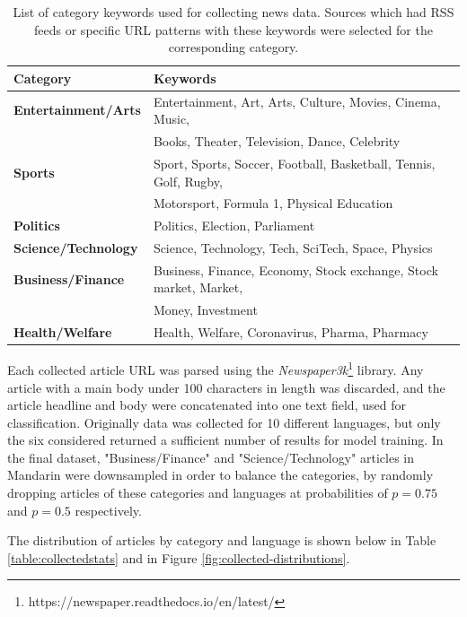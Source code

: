 \documentclass{l4proj}
\begin{document}
\begin{table}[h]
\begin{tabular}{ll}
\hline
\textbf{Category}           & \textbf{Keywords}                                                 \\ \hline
\textbf{Entertainment/Arts} & Entertainment, Art, Arts, Culture, Movies, Cinema, Music,         \\
\textbf{}                   & Books, Theater, Television, Dance, Celebrity                      \\
\textbf{Sports}             & Sport, Sports, Soccer, Football, Basketball, Tennis, Golf, Rugby, \\
\textbf{}                   & Motorsport, Formula 1, Physical Education                         \\
\textbf{Politics}           & Politics, Election, Parliament                                    \\
\textbf{Science/Technology} & Science, Technology, Tech, SciTech, Space, Physics                \\
\textbf{Business/Finance}   & Business, Finance, Economy, Stock exchange, Stock market, Market, \\
\textbf{}                   & Money, Investment                                                 \\
\textbf{Health/Welfare}     & Health, Welfare, Coronavirus, Pharma, Pharmacy                    \\ \hline
\end{tabular}
\caption{List of category keywords used for collecting news data. Sources which had RSS feeds or specific URL patterns with these keywords were selected for the corresponding category.}
\label{fig:dataset_category_keywords}
\end{table}

Each collected article URL was parsed using the \emph{Newspaper3k}\footnote{https://newspaper.readthedocs.io/en/latest/} library. Any article with a main body under 100 characters in length was discarded, and the article headline and body were concatenated into one text field, used for classification. Originally data was collected for 10 different languages, but only the six considered returned a sufficient number of results for model training. In the final dataset, "Business/Finance" and "Science/Technology" articles in Mandarin were downsampled in order to balance the categories, by randomly dropping articles of these categories and languages at probabilities of $p=0.75$ and $p=0.5$ respectively. \par
The distribution of articles by category and language is shown below in Table \ref{table:collectedstats} and in Figure \ref{fig:collected-distributions}.
\end{document}
